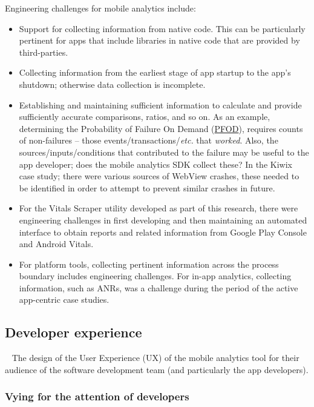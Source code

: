 Engineering challenges for mobile analytics include:
\begin{itemize}
    \item Support for collecting information from native code. This can be particularly pertinent for apps that include libraries in native code that are provided by third-parties.
    \item Collecting information from the earliest stage of app startup to the app's shutdown; otherwise data collection is incomplete.
    \item Establishing and maintaining sufficient information to calculate and provide sufficiently accurate comparisons, ratios, and so on. As an example, determining the Probability of Failure On Demand (\href{glossary-pfod}{PFOD}), requires counts of non-failures -- those events/transactions/\emph{etc.} that \emph{worked}. Also, the sources/inputs/conditions that contributed to the failure may be useful to the app developer; does the mobile analytics SDK collect these? In the Kiwix case study; there were various sources of WebView crashes, these needed to be identified in order to attempt to prevent similar crashes in future.
    \item For the Vitals Scraper utility developed as part of this research, there were engineering challenges in first developing and then maintaining an automated interface to obtain reports and related information from Google Play Console and Android Vitals.
    \item For platform tools, collecting pertinent information across the process boundary includes engineering challenges. For in-app analytics, collecting information, such as ANRs, was a challenge during the period of the active app-centric case studies. 
\end{itemize}


\subsection{Developer experience}~\label{section-developer-experience-ux-design}
The design of the User Experience (UX) of the mobile analytics tool for their audience of the software development team (and particularly the app developers).





\subsubsection{Vying for the attention of developers}~\label{section-vying-for-devs-attention}

